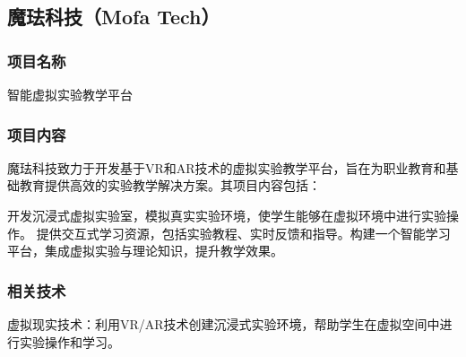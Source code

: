 




\subsection{魔珐科技（Mofa Tech）}\label{魔珐科技（Mofa Tech）}

\subsubsection{项目名称}

智能虚拟实验教学平台

\subsubsection{项目内容}

魔珐科技致力于开发基于VR和AR技术的虚拟实验教学平台，旨在为职业教育和基础教育提供高效的实验教学解决方案。其项目内容包括：

开发沉浸式虚拟实验室，模拟真实实验环境，使学生能够在虚拟环境中进行实验操作。
提供交互式学习资源，包括实验教程、实时反馈和指导。构建一个智能学习平台，集成虚拟实验与理论知识，提升教学效果。

\subsubsection{相关技术}

虚拟现实技术：利用VR/AR技术创建沉浸式实验环境，帮助学生在虚拟空间中进行实验操作和学习。

